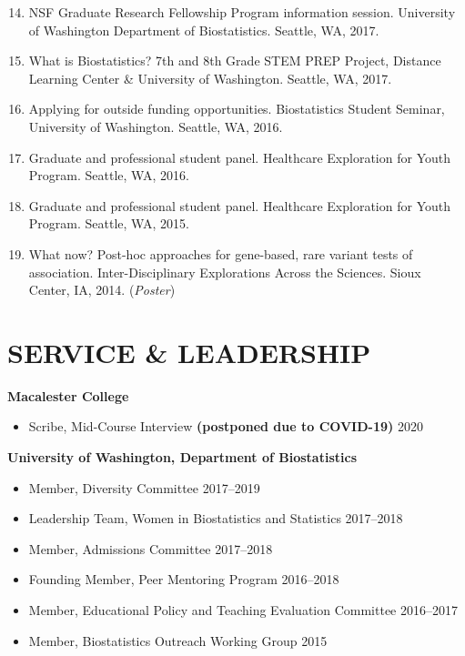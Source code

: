 \documentclass[margin]{res}
\newenvironment{benumerate}[1]{
    \let\oldItem\item
    \def\item{\addtocounter{enumi}{-2}\oldItem}
    
    \begin{enumerate}
    \setcounter{enumi}{#1}
    \addtocounter{enumi}{1}
}{
    \end{enumerate}
}
\begin{document}
\begin{resume}
\begin{benumerate}{13}
\item %
NSF Graduate Research Fellowship Program information session. University of Washington Department of Biostatistics. Seattle, WA, 2017.

\item %
What is Biostatistics? 7th and 8th Grade STEM PREP Project, Distance Learning Center \& University of Washington. Seattle, WA, 2017.

\item %
Applying for outside funding opportunities. Biostatistics Student Seminar, University of Washington. Seattle, WA, 2016.

\item Graduate and professional student panel. Healthcare Exploration for Youth Program. Seattle, WA, 2016.

\item Graduate and professional student panel. Healthcare Exploration for Youth Program. Seattle, WA, 2015.

\item %
What now? Post-hoc approaches for gene-based, rare variant tests of association. Inter-Disciplinary Explorations Across the Sciences. Sioux Center, IA, 2014.  (\textit{Poster})\\
\end{benumerate}

\section{SERVICE \& LEADERSHIP}  
\textbf{Macalester College}
	\begin{itemize} \itemsep -2pt
	\item Scribe, Mid-Course Interview \textbf{(postponed due to COVID-19)}  \hfill 2020
	\end{itemize}

\textbf{University of Washington, Department of Biostatistics}
			\begin{itemize} \itemsep -2pt
			\item Member, Diversity Committee \hfill 2017--2019
			\item Leadership Team, Women in Biostatistics and Statistics \hfill 2017--2018
			\item Member, Admissions Committee \hfill 2017--2018
			\item Founding Member, Peer Mentoring Program \hfill 2016--2018
			\item Member, Educational Policy and Teaching Evaluation Committee \hfill 2016--2017
			\item Member, Biostatistics Outreach Working Group \hfill 2015
			\end{itemize}


\end{resume}
\end{document}
